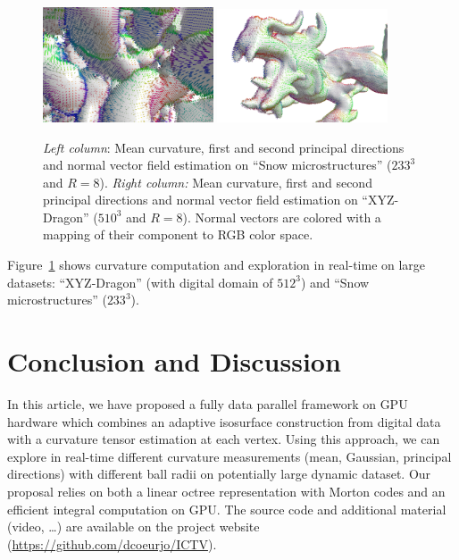 \documentclass{llncs}
\begin{document}
\begin{figure}[h!]
\begin{center}
     {\includegraphics[width=0.45\textwidth]{figs/snow_r8_normales}}
     {\includegraphics[width=0.45\textwidth]{figs/dragon_r8_normales}}

   \end{center}
   \caption{\emph{Left column}: Mean curvature, first and second
     principal directions and normal vector field estimation on ``Snow microstructures'' ($233^3$ and $R=8$).
  \emph{Right column:} Mean curvature, first and second principal
  directions and normal vector field estimation on ``XYZ-Dragon'' ($510^3$
  and $R=8$). Normal vectors are colored with a mapping of their
  component to RGB color space.}\label{fig:adaptive}
   \vspace{-0.35cm}
 \end{figure}
 Figure~\ref{fig:adaptive} shows curvature computation and exploration in
 real-time on large datasets: ``XYZ-Dragon'' (with digital domain of $512^3$) and
 ``Snow microstructures'' ($233^3$).

\section{Conclusion and Discussion}
\label{sec:discussion}

In this article, we have proposed a fully data parallel framework on GPU
hardware which combines an adaptive isosurface construction from
digital data with a curvature tensor estimation at each vertex. Using
this approach, we can explore in real-time different curvature
measurements (mean, Gaussian, principal directions) with different
ball radii on potentially large dynamic dataset. Our proposal relies
on both a linear octree representation with Morton codes and an
efficient integral computation on GPU\@. The source code and additional
material (video, \ldots) are available on the project website
(\url{https://github.com/dcoeurjo/ICTV}).
\end{document}
